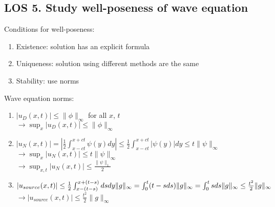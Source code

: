 \documentclass[12pt, a4paper]{article}
\begin{document}
\subsection*{LOS 5. Study well-poseness of wave equation}
Conditions for well-poseness:
\begin{enumerate}
    \item Existence: solution has an explicit formula
    \item Uniqueness: solution using different methods are the same
    \item Stability: use norms\\
\end{enumerate}
Wave equation norms:
\begin{enumerate}
    \item $|u_D(x, t)| \leq \|\phi\|_\infty$ for all $x$, $t$ \\
    $\rightarrow \sup_x|u_D(x, t)| \leq \|\phi\|_\infty$\\
    \item $|u_N(x, t)| = |\frac{1}{2}\int_{x-ct}^{x+ct}\psi(y)dy| \leq \frac{1}{2}\int_{x-ct}^{x+ct}|\psi(y)|dy \leq t\|\psi\|_\infty$ \\ $\rightarrow \sup_x|u_N(x, t)| \leq t\|\psi\|_\infty$\\
    $\rightarrow\sup_{x, t}|u_N(x, t)| \leq \frac{\|\psi\|_1}{2}$\\
    \item $|u_{source}(x, t)| \leq \frac{1}{2}\int_{x-(t-s)}^{x+(t-s)}dsdy \|g\|_\infty \\= \int_0^t(t-sds)\|g\|_\infty = \int_0^tsds\|g\|_\infty \leq \frac{t^2}{2}\|g\|_\infty$ \\
    $\rightarrow |u_{source}(x, t)| \leq \frac{t^2}{2}\|g\|_\infty$
\end{enumerate}
\vspace{0.3em}
\end{document}
